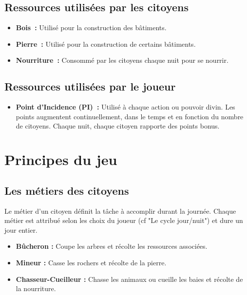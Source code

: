 \documentclass[a4paper]{article}
\begin{document}
\subsection*{Ressources utilisées par les citoyens}
\begin{itemize}
\item \textbf{Bois :} \small{ Utilisé pour la construction des bâtiments.}
\item \textbf{Pierre :} \small{ Utilisé pour la construction de certains bâtiments.}
\item \textbf{Nourriture :} \small{ Consommé par les citoyens chaque nuit pour se nourrir.}
\end{itemize}

\subsection*{Ressources utilisées par le joueur}
\begin{itemize}
\item \textbf{Point d'Incidence (PI) :} \small{ Utilisé à chaque action ou pouvoir divin. Les points augmentent continuellement, dans le temps et en fonction du nombre de citoyens. Chaque nuit, chaque citoyen rapporte des points bonus.}
\end{itemize}


\section*{Principes du jeu}

\subsection*{Les métiers des citoyens}
Le métier d'un citoyen définit la tâche à accomplir durant la journée. Chaque métier est attribué selon les choix du joueur (cf "Le cycle jour/nuit") et dure un jour entier.
\begin{itemize}
\item \textbf{Bûcheron :} \small{ Coupe les arbres et récolte les ressources associées.}
\item \textbf{Mineur :} \small{ Casse les rochers et récolte de la pierre.}
\item \textbf{Chasseur-Cueilleur :} \small{ Chasse les animaux ou cueille les baies et récolte de la nourriture.}
\end{itemize}
\end{document}
